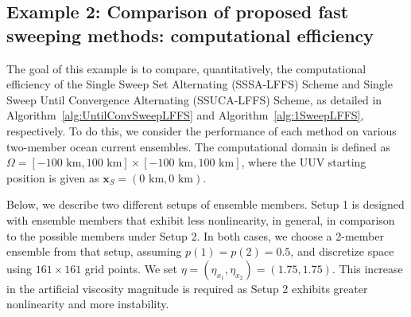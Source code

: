\documentclass[pdflatex,sn-mathphys-num]{sn-jnl}%
\def \bx{{\mathbf {x}}}
\theoremstyle{thmstyleone}%
\theoremstyle{thmstyletwo}%
\theoremstyle{thmstylethree}%
\begin{document}
\subsection{Example 2: Comparison of proposed fast sweeping methods: computational efficiency}
\label{num_eff}

The goal of this example is to compare, quantitatively, the computational efficiency of the Single Sweep Set Alternating (SSSA-LFFS) Scheme and Single Sweep Until Convergence Alternating (SSUCA-LFFS) Scheme, as detailed in Algorithm~\ref{alg:UntilConvSweepLFFS} and Algorithm~\ref{alg:1SweepLFFS}, respectively.  To do this, we consider the performance of each method on various two-member ocean current ensembles.  
The computational domain is defined as $\Omega = [-100\text{ km},100\text{ km}] \times [-100\text{ km},100\text{ km}]$, where the UUV starting position is given as $\bx_S = (0\text{ km},0\text{ km})$.

Below, we describe two different setups of ensemble members.  Setup 1 is designed with ensemble members that exhibit less nonlinearity, in general, in comparison to the possible members under Setup 2.  In both cases, we choose a 2-member ensemble from that setup, assuming  $p(1)=p(2)=0.5$, and discretize space using $161 \times 161$ grid points.  We set $\eta=(\eta_{x_1},\eta_{x_2})=(1.75,1.75)$.  This increase in the artificial viscosity magnitude is required as Setup 2 exhibits greater nonlinearity and more instability.
\end{document}
